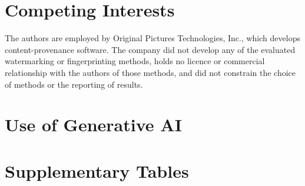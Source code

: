 \documentclass[11pt,letterpaper]{article}
\begin{document}
\section*{Competing Interests}
The authors are employed by Original Pictures Technologies, Inc., which develops content-provenance software. The company did not develop any of the evaluated watermarking or fingerprinting methods, holds no licence or commercial relationship with the authors of those methods, and did not constrain the choice of methods or the reporting of results.

\section*{Use of Generative AI}





\clearpage
\appendix
\section{Supplementary Tables}
\label{app:tables}
\begingroup
\let\supplementarytable\table
\renewcommand{\table}[1][]{\supplementarytable[H]}
\renewenvironment{table*}[1][]{\supplementarytable[H]}{\endtable}


\clearpage
\endgroup
\end{document}
